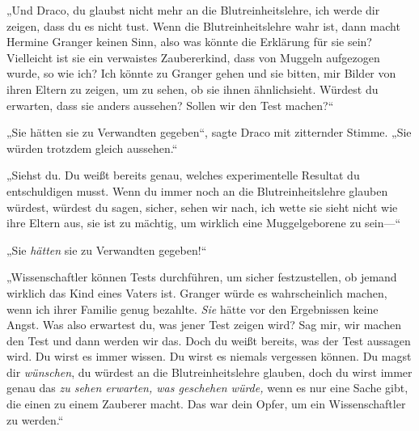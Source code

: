 „Und Draco, du glaubst nicht mehr an die Blutreinheitslehre, ich werde dir zeigen, dass du es nicht tust. Wenn die Blutreinheitslehre wahr ist, dann macht Hermine Granger keinen Sinn, also was könnte die Erklärung für sie sein? Vielleicht ist sie ein verwaistes Zaubererkind, dass von Muggeln aufgezogen wurde, so wie ich? Ich könnte zu Granger gehen und sie bitten, mir Bilder von ihren Eltern zu zeigen, um zu sehen, ob sie ihnen ähnlichsieht. Würdest du erwarten, dass sie anders aussehen? Sollen wir den Test machen?“

„Sie hätten sie zu Verwandten gegeben“, sagte Draco mit zitternder Stimme.
„Sie würden trotzdem gleich aussehen.“

„Siehst du. Du weißt bereits genau, welches experimentelle Resultat du entschuldigen musst. Wenn du immer noch an die Blutreinheitslehre glauben würdest, würdest du sagen, sicher, sehen wir nach, ich wette sie sieht nicht wie ihre Eltern aus, sie ist zu mächtig, um wirklich eine Muggelgeborene zu sein—“

„Sie \emph{hätten} sie zu Verwandten gegeben!“

„Wissenschaftler können Tests durchführen, um sicher festzustellen, ob jemand wirklich das Kind eines Vaters ist. Granger würde es wahrscheinlich machen, wenn ich ihrer Familie genug bezahlte. \emph{Sie} hätte vor den Ergebnissen keine Angst. Was also erwartest du, was jener Test zeigen wird? Sag mir, wir machen den Test und dann werden wir das. Doch du weißt bereits, was der Test aussagen wird. Du wirst es immer wissen. Du wirst es niemals vergessen können. Du magst dir \emph{wünschen}, du würdest an die Blutreinheitslehre glauben, doch du wirst immer genau das \emph{zu sehen erwarten, was geschehen würde,} wenn es nur eine Sache gibt, die einen zu einem Zauberer macht. Das war dein Opfer, um ein Wissenschaftler zu werden.“

